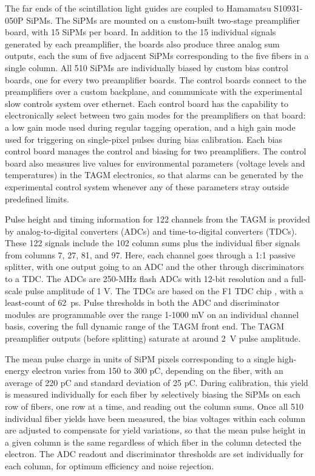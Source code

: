 The far ends of the scintillation light guides are coupled to Hamamatsu S10931-050P SiPMs. The SiPMs are mounted on a custom-built two-stage preamplifier board, with 15 SiPMs per board. In addition to the 15 individual signals generated
by each preamplifier, the boards also produce three analog sum outputs, each the sum
of five adjacent SiPMs corresponding to the five fibers in a single column. All 510
SiPMs are individually biased by custom bias control boards, one for every two
preamplifier boards. The control boards connect to the
preamplifiers over a custom backplane, and communicate with the
experimental slow controls system over ethernet. Each control board has the
capability to electronically select between two gain modes for the preamplifiers
on that board:
a low gain mode used during regular tagging operation, and a high gain
mode used for triggering on single-pixel pulses during bias calibration.
Each bias control board manages the control and biasing for two preamplifiers.
The control board also measures live values for environmental parameters
(voltage levels and temperatures) in the TAGM electronics, so that alarms can
be generated by the experimental control system whenever any of these parameters
stray outside predefined limits.

Pulse height and timing information for 122 channels from the TAGM is provided by analog-to-digital converters (ADCs) and time-to-digital converters (TDCs). These 122
signals include the 102 column sums plus the individual fiber signals from
columns 7, 27, 81, and 97. Here, each channel goes through a 1:1
passive splitter, with one output going to an ADC and the other through
discriminators to a TDC. The ADCs are 250-MHz flash ADCs with 12-bit
resolution and a full-scale pulse amplitude of 1 V. The TDCs are based
on the F1 TDC chip \cite{Fischer:2000zu}, with a least-count of 62~ps. Pulse thresholds in both
the ADC and discriminator modules are programmable over the range 1-1000 mV
on an individual channel basis, covering the full dynamic range of the TAGM
front end. The TAGM preamplifier outputs (before splitting) saturate at around
2~V pulse amplitude.

The mean pulse charge in units of SiPM pixels corresponding to a
single high-energy electron varies from 150 to 300 pC, depending on the fiber,
with an average of 220 pC and standard deviation of 25 pC. During calibration,
this yield is measured individually for each fiber by selectively biasing
the SiPMs on each row of fibers, one row at a time, and reading out the column
sums. Once all 510 individual fiber yields have been measured, the bias voltages
within each column are adjusted to compensate for yield variations, so
that the mean pulse height in a given column is the same regardless of which
fiber in the column detected the electron. The ADC readout and discriminator
thresholds are set individually for each column, for optimum efficiency and
noise rejection.

